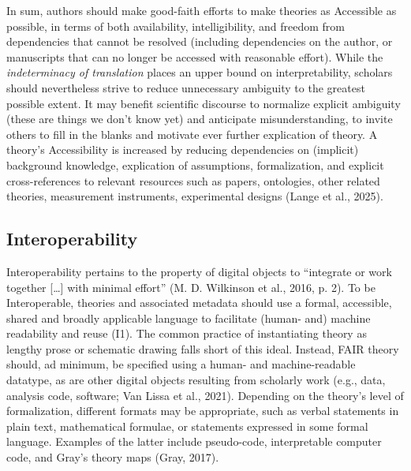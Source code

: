 \documentclass[
  man, noextraspace,floatsintext]{apa7}
\begin{document}
In sum, authors should make good-faith efforts to make theories as Accessible as possible, in terms of both availability, intelligibility, and freedom from dependencies that cannot be resolved (including dependencies on the author, or manuscripts that can no longer be accessed with reasonable effort).
While the \emph{indeterminacy of translation} places an upper bound on interpretability,
scholars should nevertheless strive to reduce unnecessary ambiguity to the greatest possible extent.
It may benefit scientific discourse to normalize explicit ambiguity (these are things we don't know yet) and anticipate misunderstanding,
to invite others to fill in the blanks and motivate ever further explication of theory.
A theory's Accessibility is increased by
reducing dependencies on (implicit) background knowledge,
explication of assumptions,
formalization,
and explicit cross-references to relevant resources such as papers, ontologies, other related theories, measurement instruments, experimental designs (Lange et al., 2025).

\subsection{Interoperability}\label{interoperability}

Interoperability pertains to the property of digital objects to ``integrate or work together {[}\ldots{]} with minimal effort'' (M. D. Wilkinson et al., 2016, p. 2).
To be Interoperable, theories and associated metadata should use a formal, accessible, shared and broadly applicable language to facilitate (human- and) machine readability and reuse (I1).
The common practice of instantiating theory as lengthy prose or schematic drawing falls short of this ideal.
Instead, FAIR theory should, ad minimum,
be specified using a human- and machine-readable datatype,
as are other digital objects resulting from scholarly work (e.g., data, analysis code, software; Van Lissa et al., 2021).
Depending on the theory's level of formalization,
different formats may be appropriate,
such as verbal statements in plain text,
mathematical formulae,
or statements expressed in some formal language.
Examples of the latter include pseudo-code,
interpretable computer code,
and Gray's theory maps (Gray, 2017).
\end{document}
